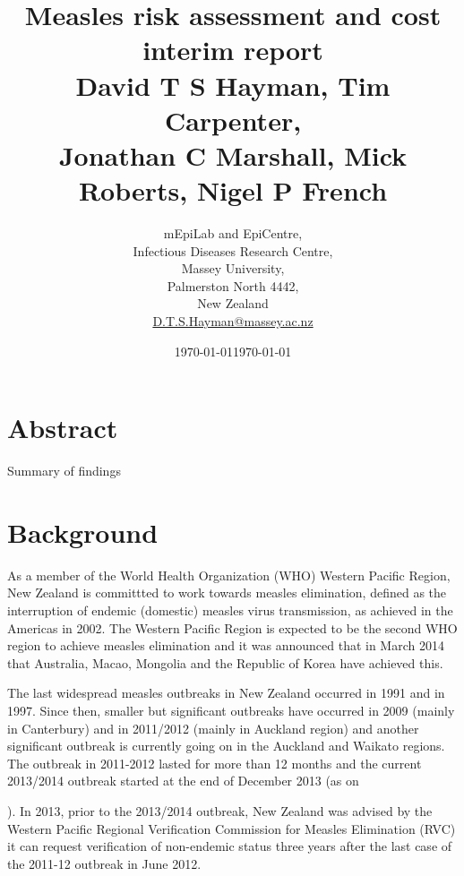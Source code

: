 \documentclass{article}
\begin{document}


\title{Measles risk assessment and cost interim report\\ \vspace{2 mm} {\large David T S Hayman, Tim Carpenter,\\ Jonathan C Marshall, Mick Roberts, Nigel P French}}
\author{mEpiLab and EpiCentre,\\ Infectious Diseases Research Centre,\\
Massey University,\\
Palmerston North 4442,\\
New Zealand\\
\href{mailto: D.T.S.Hayman@massey.ac.nz}{D.T.S.Hayman@massey.ac.nz}}  %
\date{\today}  %
\maketitle

\section{Abstract}

Summary of findings

\section{Background}

As a member of the World Health Organization (WHO) Western Pacific Region, New Zealand is committted to work towards measles elimination, defined as the interruption of endemic (domestic) measles virus transmission, as achieved in the Americas in 2002. The Western Pacific Region is expected to be the second WHO region to  achieve measles elimination and it was announced that in March 2014 that Australia, Macao, Mongolia and the Republic of Korea have achieved this.

The last widespread measles outbreaks in New Zealand occurred in 1991 and in 1997. Since then, smaller but significant outbreaks have occurred in 2009 (mainly in Canterbury) and in 2011/2012 (mainly in Auckland region) and another significant outbreak is currently going on in the Auckland and Waikato regions. The outbreak in 2011-2012 lasted for more than 12 months and the current 2013/2014 outbreak started at the end of December 2013 (as on \date{\today}). In 2013, prior to the 2013/2014 outbreak, New Zealand was advised by the Western Pacific Regional Verification Commission for Measles Elimination (RVC) it can request verification of non-endemic status three years after the last case of the 2011-12 outbreak in June 2012.
\end{document}
